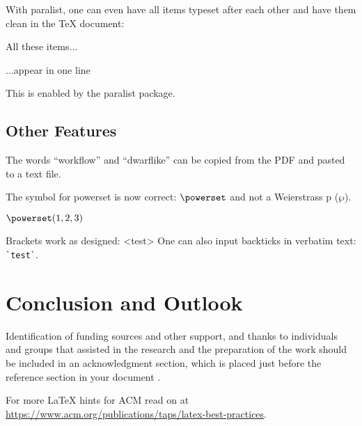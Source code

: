 \documentclass[sigconf,balance]{acmart}
\begin{document}
With paralist, one can even have all items typeset after each other and have them clean in the TeX document:

\begin{ltgexample}
\begin{inparaenum}
  \item All these items...
  \item ...appear in one line
  \item This is enabled by the paralist package.
\end{inparaenum}
\end{ltgexample}

\subsection{Other Features}

\begin{ltgexample}
The words \enquote{workflow} and \enquote{dwarflike} can be copied from the PDF and pasted to a text file.
\end{ltgexample}

\begin{ltgexample}
The symbol for powerset is now correct: $\powerset$ and not a Weierstrass p ($\wp$).

$\powerset({1,2,3})$
\end{ltgexample}

\begin{ltgexample}
Brackets work as designed:
<test>
One can also input backticks in verbatim text: \verb|`test`|.
\end{ltgexample}


\section{Conclusion and Outlook}
\label{sec:outlook}
\lipsum[1-2]

\begin{acks}
Identification of funding sources and other support, and thanks to individuals and groups that assisted in the research and the preparation of the work should be included in an acknowledgment section, which is placed just before the reference section in your document \cite{acmart}.

For more \LaTeX{} hints for ACM read on at \url{https://www.acm.org/publications/taps/latex-best-practices}.
\end{acks}

\end{document}
